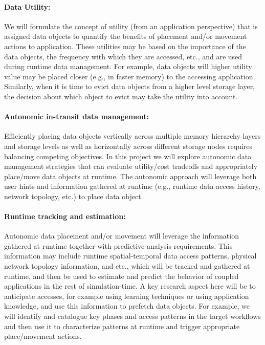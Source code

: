 \paragraph{Data Utility:} We will formulate the concept of utility (from an
application perspective) that is assigned data objects to quantify the
benefits of placement and/or movement actions to application. These
utilities may be based on the importance of the data objects, the frequency
with which they are accessed, etc., and are used during runtime data
management. For example, data objects will higher utility value may be
placed closer (e.g., in faster memory) to the accessing application.
Similarly, when it is time to evict data objects from a higher level storage
layer, the decision about which object to evict may take the utility into
account.

\paragraph{Autonomic in-transit data management:} 
Efficiently placing data objects
vertically across multiple memory hierarchy layers and storage levels as
well as horizontally across different storage nodes requires balancing
competing objectives. In this project we will explore autonomic data
management strategies that can evaluate utility/cost tradeoffs and
appropriately place/move data objects at runtime. The autonomic approach
will leverage both user hints and information gathered at runtime (e.g.,
runtime data access history, network topology, etc.) to place data object.

\paragraph{ Runtime tracking and estimation:}
Autonomic data placement and/or
movement will leverage the information gathered at runtime together with
predictive analysis requirements. This information may include runtime
spatial-temporal data access patterns, physical network topology
information, and etc., which will be tracked and gathered at runtime, and
then be used to estimate and predict the behavior of coupled applications in
the rest of simulation-time. A key research aspect here will be to
anticipate accesses, for example using learning techniques or using
application knowledge, and use this information to prefetch data objects.
For example, we will identify and catalogue key phases and access patterns
in the target workflows and then use it to characterize patterns at runtime
and trigger appropriate place/movement actions.

